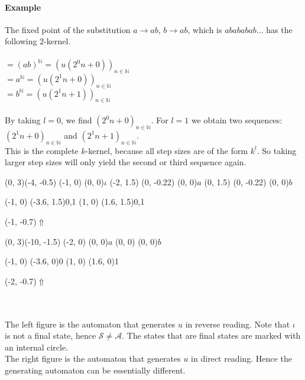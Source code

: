 \documentclass{article}
\begin{document}
\paragraph{Example}
The fixed point of the substitution $a \rightarrow ab$, $b \rightarrow ab$,
which is $abababab\ldots$ has the following 2-kernel.\\
\\
$= (ab)^\mathbb{N} = (u(2^0 n + 0))_{n \in \mathbb{N}}$\\
$= a^\mathbb{N} = (u(2^1 n + 0))_{n \in \mathbb{N}}$\\
$= b^\mathbb{N} = (u(2^1 n + 1))_{n \in \mathbb{N}}$\\
\\
By taking $l = 0$, we find $(2^0 n + 0)_{n \in \mathbb{N}}$. For $l = 1$ we
obtain two sequences: $(2^1 n + 0)_{n \in \mathbb{N}}$ and
$(2^1 n + 1)_{n \in \mathbb{N}}$.\\
This is the complete $k$-kernel, because all step sizes are of the form
$k^l$. So taking larger step sizes will only yield the second or third
sequence again.\\
\begin{graph}(0, 3)(-4, -0.5)
  (-1, 0) (0, 0){$\iota$}
  (-2, 1.5)
    (0, -0.22){} (0, 0){$a$}
  (0, 1.5)
    (0, -0.22){} (0, 0){$b$}

   
   
  (-1, 0) \freetext(-3.6, 1.5){0,1}
  (1, 0) \freetext(1.6, 1.5){0,1}

  \freetext(-1, -0.7){$\Uparrow$}
\end{graph}
\begin{graph}(0, 3)(-10, -1.5)
  (-2, 0) (0, 0){$a$}
  (0, 0)  (0, 0){$b$}

  (-1, 0) \freetext(-3.6, 0){0}
   
   
  (1, 0) \freetext(1.6, 0){1}

  \freetext(-2, -0.7){$\Uparrow$}
\end{graph}\\
\\
The left figure is the automaton that generates $u$ in reverse reading. Note 
that $\iota$ is not a final state, hence $\mathcal{S} \ne \mathcal{A}$. The 
states that are final states are marked with an internal circle.\\
The right figure is the automaton that generates $u$ in direct reading. Hence
the generating automaton can be essentially different.
\end{document}
